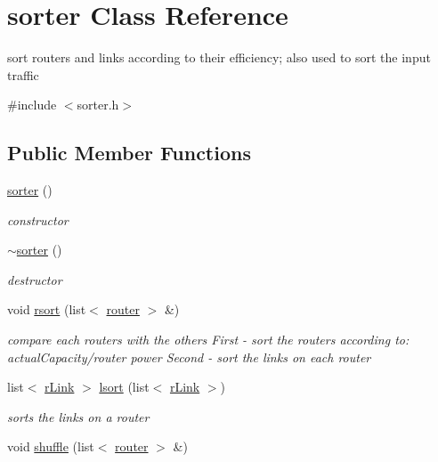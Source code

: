 \hypertarget{classsorter}{
\section{sorter Class Reference}
\label{classsorter}
}


sort routers and links according to their efficiency; also used to sort the input traffic  




{\ttfamily \#include $<$sorter.h$>$}

\subsection*{Public Member Functions}
\begin{DoxyCompactItemize}
\item 
\hyperlink{classsorter_a0ff82eecc48ab163c3286cee244b7d92}{sorter} ()
\begin{DoxyCompactList}\small\item\em constructor \item\end{DoxyCompactList}\item 
\hyperlink{classsorter_a27f9666807092c172a5ad6f0048d2b57}{$\sim$sorter} ()
\begin{DoxyCompactList}\small\item\em destructor \item\end{DoxyCompactList}\item 
void \hyperlink{classsorter_aa5c4e14df085599365f57f144ffb25be}{rsort} (list$<$ \hyperlink{classrouter}{router} $>$ \&)
\begin{DoxyCompactList}\small\item\em compare each routers with the others First -\/ sort the routers according to: actualCapacity/router power Second -\/ sort the links on each router \item\end{DoxyCompactList}\item 
list$<$ \hyperlink{classrLink}{rLink} $>$ \hyperlink{classsorter_a8c6f644537f597bc5ab57e2012655754}{lsort} (list$<$ \hyperlink{classrLink}{rLink} $>$)
\begin{DoxyCompactList}\small\item\em sorts the links on a router \item\end{DoxyCompactList}\item 
void \hyperlink{classsorter_a4b7e91f19fb0bcb73c1e32d168353b40}{shuffle} (list$<$ \hyperlink{classrouter}{router} $>$ \&)

\end{DoxyCompactItemize}

